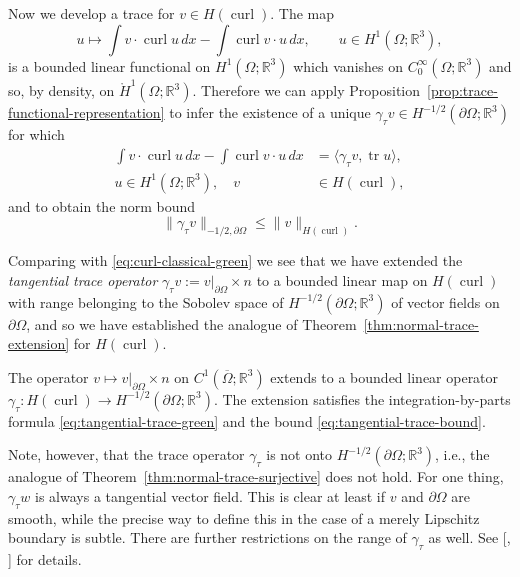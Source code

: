 {Now we develop a trace for $v\in H(\operatorname{curl})$. The map}
\[
u\mapsto\int v\cdot\operatorname{curl}u\,dx-\int\operatorname{curl}v\cdot u\,dx,\qquad u\in H^1(\Omega;\mathbb R^3),
\]
{is a bounded linear functional on $H^1(\Omega;\mathbb R^3)$ which vanishes on $C_0^\infty(\Omega;\mathbb R^3)$ and so, by density, on $\mathring H^1(\Omega;\mathbb R^3)$. Therefore we can apply Proposition~\ref{prop:trace-functional-representation} to infer the existence of a unique $\gamma_\tau v\in H^{-1/2}(\partial\Omega;\mathbb R^3)$ for which}
\begin{equation}\label{eq:tangential-trace-green}
\begin{aligned}
\int v\cdot\operatorname{curl}u\,dx-\int\operatorname{curl}v\cdot u\,dx&=\langle\gamma_\tau v,\operatorname{tr}u\rangle,\\
u\in H^1(\Omega;\mathbb R^3),\quad v&\in H(\operatorname{curl}),
\end{aligned}
\end{equation}
{and to obtain the norm bound}
\begin{equation}\label{eq:tangential-trace-bound}
\|\gamma_\tau v\|_{-1/2,\partial\Omega}\leq\|v\|_{H(\operatorname{curl})}.
\end{equation}

{Comparing with \eqref{eq:curl-classical-green} we see that we have extended the \emph{tangential trace operator} $\gamma_\tau v:=v|_{\partial\Omega}\times n$ to a bounded linear map on $H(\operatorname{curl})$ with range belonging to the Sobolev space of $H^{-1/2}(\partial\Omega;\mathbb R^3)$ of vector fields on $\partial\Omega$, and so we have established the analogue of Theorem~\ref{thm:normal-trace-extension} for $H(\operatorname{curl})$.}

\begin{Theorem}\label{thm:tangential-trace-extension}
{The operator $v\mapsto v|_{\partial\Omega}\times n$ on $C^1(\overline\Omega;\mathbb R^3)$ extends to a bounded linear operator $\gamma_\tau:H(\operatorname{curl})\to H^{-1/2}(\partial\Omega;\mathbb R^3)$. The extension satisfies the integration-by-parts formula \eqref{eq:tangential-trace-green} and the bound \eqref{eq:tangential-trace-bound}.}
\end{Theorem}

{Note, however, that the trace operator $\gamma_\tau$ is not onto $H^{-1/2}(\partial\Omega;\mathbb R^3)$, i.e., the analogue of Theorem~\ref{thm:normal-trace-surjective} does not hold. For one thing, $\gamma_\tau w$ is always a tangential vector field. This is clear at least if $v$ and $\partial\Omega$ are smooth, while the precise way to define this in the case of a merely Lipschitz boundary is subtle. There are further restrictions on the range of $\gamma_\tau$ as well. See [, ] for details.}

